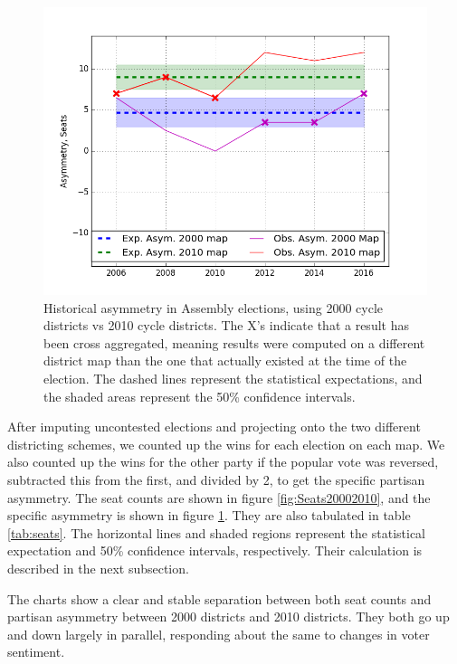 \documentclass[preprint,12pt]{article}
\begin{document}
\begin{figure}[htb!]
    \begin{center}
        \includegraphics[scale=0.85]{../Figures/WI2010/WI_2000_2010.png}
        \caption{Historical asymmetry in Assembly elections, using 2000 cycle districts vs 2010 cycle districts. The X's indicate that a result has been cross aggregated, meaning results were computed on a different district map than the one that actually existed at the time of the election.  The dashed lines represent the statistical expectations, and the shaded areas represent the 50\% confidence intervals.}\label{fig:Asym20002010}
    \end{center}
\end{figure}

After imputing uncontested elections and projecting onto the two different districting schemes, we counted up the wins for each election on each map.
We also counted up the wins for the other party if the popular vote was reversed, subtracted this from the first, and divided by 2, to get the specific partisan asymmetry.
The seat counts are shown in figure \ref{fig:Seats20002010}, and the specific asymmetry is shown in figure \ref{fig:Asym20002010}.  They are also tabulated in table \ref{tab:seats}.
The horizontal lines and shaded regions represent the statistical expectation and 50\% confidence intervals, respectively.
Their calculation is described in the next subsection.

The charts show a clear and stable separation between both seat counts and partisan asymmetry between 2000 districts and 2010 districts.
They both go up and down largely in parallel, responding about the same to changes in voter sentiment.
\end{document}

